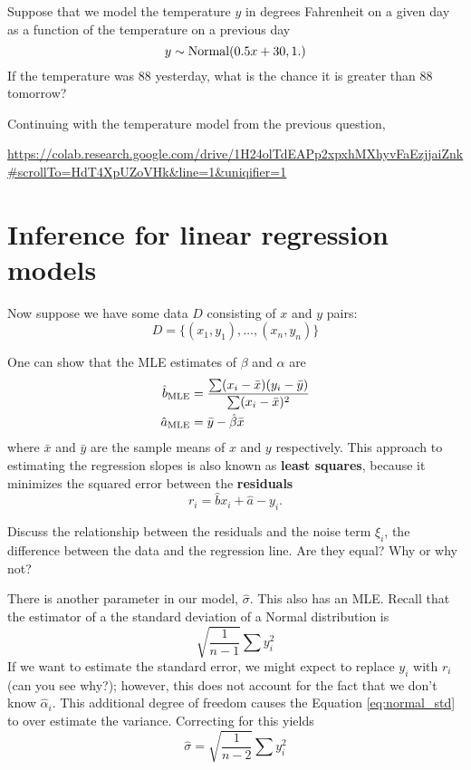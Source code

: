 \begin{example} Suppose that we model the temperature $y$ in degrees Fahrenheit on a given day as a function of the temperature on a previous day 
\begin{equation}
y \sim {\rm Normal}(0.5x+ 30,1.)
\end{equation}
If the temperature was $88$ yesterday, what is the chance it is greater than $88$ tomorrow? 
\end{example}

\begin{exercise} Continuing with the temperature model from the previous question,  
\end{exercise}



\url{https://colab.research.google.com/drive/1H24olTdEAPp2xpxhMXhyvFaEzjjaiZnk#scrollTo=HdT4XpUZoVHk&line=1&uniqifier=1}

\section{Inference for linear regression models}
Now suppose we have some data $D$ consisting of $x$ and $y$ pairs:
\begin{equation}
D = \{(x_1,y_1),\dots,(x_n,y_n)\}
\end{equation}


One can show that the MLE estimates of $\beta$ and $\alpha$ are 
\begin{align}
\hat{b}_{\rm MLE} &= \frac{\sum (x_i - \bar{x})(y_i - \bar{y})}{\sum (x_i-\bar{x})^2} \\
\hat{a}_{\rm MLE} &= \bar{y} - \hat{\beta} \bar{x}
\end{align}
where $\bar{x}$ and $\bar{y}$ are the sample means of $x$ and $y$ respectively. 
This approach to estimating the regression slopes is also known as {\bf least squares}, because it minimizes the squared error between the {\bf residuals}
 \begin{equation}
r_i =\hat{b} x_i + \hat{a}- y_i. 
\end{equation}


\begin{exercise}  Discuss the relationship between the residuals and the noise term $\xi_i$, the difference between the data and the regression line.   Are they equal? Why or why not? 
\end{exercise}



There is another parameter in our model, $\hat{\sigma}$. This also has an MLE.  Recall that the estimator of a the standard deviation of a Normal distribution is 
\begin{equation}\label{eq:normal_std}
\sqrt{\frac{1}{n-1}}\sum y_i^2
\end{equation}
If we want to estimate the standard error, we might expect to replace $y_i$ with $r_i$ (can you see why?); however, this does not account for the fact that we don't know $\hat{\alpha}_i$. This additional degree of freedom causes the Equation \eqref{eq:normal_std} to over estimate the variance. Correcting for this yields  
\begin{equation}
\hat{\sigma} = \sqrt{\frac{1}{n-2}}\sum y_i^2
\end{equation}


